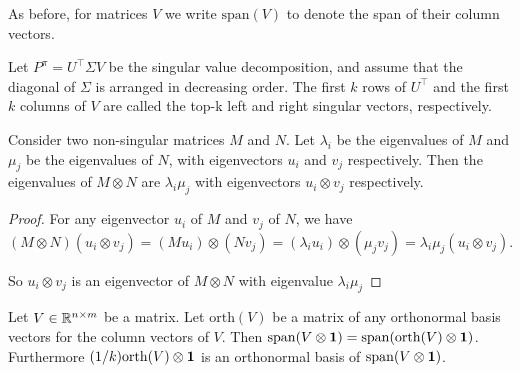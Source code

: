 As before, for matrices $V$ we write $\mathrm{span}(V)$ to denote the span of their column vectors. 

\begin{definition}\label{def:topk-single}
Let $P^\pi = U^\top \Sigma V$ be the singular value decomposition, and assume that the diagonal of $\Sigma$ is arranged in decreasing order.
The first $k$ rows of $U^\top$ and the first $k$ columns of $V$ are called the top-k left and right singular vectors, respectively.
\end{definition}

\begin{lemma}\label{lem:spectrum_kronecker}
    Consider two non-singular matrices $M$ and $N$. Let $\lambda_i$ be the eigenvalues of $M$ and $\mu_j$ be the eigenvalues of $N$, with eigenvectors $u_i$ and $v_j$ respectively. Then the eigenvalues of $M\otimes N$ are $\lambda_i\mu_j$ with eigenvectors $u_i \otimes v_j$ respectively.
\end{lemma}

\begin{proof}
For any eigenvector $u_i$ of $M$ and $v_j$ of $N$, we have
    $$\left(M\otimes N\right) \left(u_i \otimes v_j\right) = \left(M u_i\right) \otimes \left(N v_j\right) = \left(\lambda_i u_i\right)\otimes\left(\mu_j v_j\right) = \lambda_i\mu_j \left(u_i \otimes v_j\right).$$

    So $u_i\otimes v_j$ is an eigenvector of $M\otimes N$ with eigenvalue $\lambda_i \mu_j$
\end{proof}

\begin{lemma}\label{lem:orth_kronecker}
    Let $V \in \mathbb{R}^{n \times m}$ be a matrix. Let $\mathrm{orth}(V)$ be a matrix of any orthonormal basis vectors for the column vectors of $V$. Then $\mathrm{span}(V\otimes {\bm{1}}) = \mathrm{span}(\mathrm{orth}(V) \otimes {\bm{1}})$. Furthermore $(1/k) \mathrm{orth}(V) \otimes {\bm{1}}$ is an orthonormal basis of $\mathrm{span}(V \otimes {\bm{1}})$.
\end{lemma}

